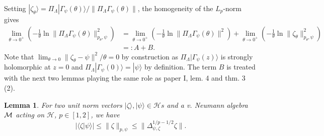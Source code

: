 \documentclass[english,a4paper,12pt]{article}
\newtheorem{lemma}{Lemma}
\def\cM{{\mathfrak M}}
\newcommand{\ca}[1]{{\cal #1}}
\newcommand{\ben}{\begin{equation}}
\newcommand{\een}{\end{equation}}
\def\cM{{\ca M}}
\renewcommand{\log}{\operatorname{ln}}
\begin{document}
Setting $|\zeta_\theta\rangle = \Pi_\Lambda |\Gamma_\psi(\theta)\rangle/\| \Pi_\Lambda \Gamma_\psi(\theta)\|$, the homogeneity of the $L_p$-norm gives
\ben
\label{eq:AB}
\begin{split}
\lim_{\theta \to 0^+} \left( -\frac{1}{\theta} \log \| \Pi_\Lambda \Gamma_\psi(\theta) \|_{p_\theta,\psi}^2 \right) &= \lim_{\theta \to 0^+} \left( -\frac{1}{\theta} 
\log \| \Pi_\Lambda \Gamma_\psi(\theta) \|^2 \right) + \lim_{\theta \to 0^+} \left( -\frac{1}{\theta} \log  \| \zeta_\theta \|_{p_\theta,\psi}^2
 \right) \\
&=: A+B.
\end{split}
\een
Note that $\lim_{\theta \to 0} \| \zeta_\theta - \psi\|^2/\theta = 0$ by construction as $\Pi_\Lambda|\Gamma_\psi(z)\rangle$ is 
strongly holomorphic at $z=0$ and $\Pi_\Lambda|\Gamma_\psi(0)\rangle=|\psi\rangle$ by definition. 
The term $B$ is treated with the next two lemmas playing the same role as paper I, lem. 4 and thm. 3 (2). 

\begin{lemma}\label{lem:squeeze}
For two unit norm vectors $|\zeta\rangle,|\psi\rangle \in {\mathscr Hs}$ and a v. Neumann algebra $\cM$ acting on $\mathscr H$, 
$p \in [1,2]$, we have 
\ben
| \langle \zeta | \psi \rangle | \le \| \zeta \|_{p,\psi} \le \| \Delta_{\psi,\zeta}^{1/p-1/2} \zeta \|.
\een
\end{lemma}
\end{document}
